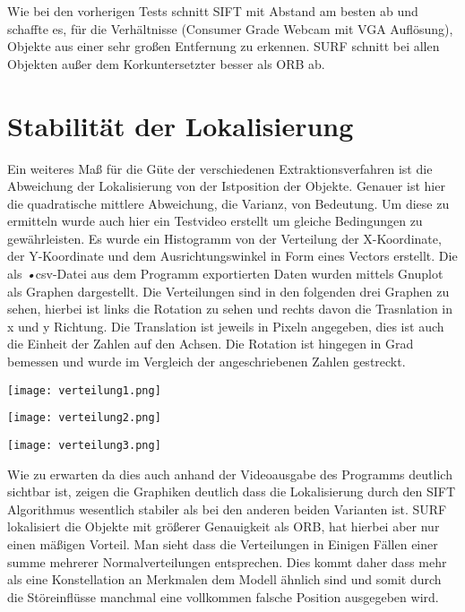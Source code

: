 Wie bei den vorherigen Tests schnitt SIFT mit Abstand am besten ab und schaffte es, für die Verhältnisse (Consumer Grade Webcam mit VGA Auflösung), Objekte aus einer sehr großen Entfernung zu erkennen.
SURF schnitt bei allen Objekten außer dem Korkuntersetzter besser als ORB ab.

\section{Stabilität der Lokalisierung}

Ein weiteres Maß für die Güte der verschiedenen Extraktionsverfahren ist die Abweichung der Lokalisierung von der Istposition der Objekte.
Genauer ist hier die quadratische mittlere Abweichung, die Varianz, von Bedeutung.
Um diese zu ermitteln wurde auch hier ein Testvideo erstellt um gleiche Bedingungen zu gewährleisten.
Es wurde ein Histogramm von der Verteilung der X-Koordinate, der Y-Koordinate und dem Ausrichtungswinkel in Form eines Vectors erstellt.
Die als \emph{•}{csv}-Datei aus dem Programm exportierten Daten wurden mittels Gnuplot als Graphen dargestellt.
Die Verteilungen sind in den folgenden drei Graphen zu sehen, hierbei ist links die Rotation zu sehen und rechts davon die Trasnlation in x und y Richtung.
Die Translation ist jeweils in Pixeln angegeben, dies ist auch die Einheit der Zahlen auf den Achsen.
Die Rotation ist hingegen in Grad bemessen und wurde im Vergleich der angeschriebenen Zahlen gestreckt.

\begin{center}
\texttt{[image: verteilung1.png]}

\texttt{[image: verteilung2.png]}

\texttt{[image: verteilung3.png]}
\end{center}


Wie zu erwarten da dies auch anhand der Videoausgabe des Programms deutlich sichtbar ist, zeigen die Graphiken deutlich dass die Lokalisierung durch den SIFT Algorithmus wesentlich stabiler als bei den anderen beiden Varianten ist.
SURF lokalisiert die Objekte mit größerer Genauigkeit als ORB, hat hierbei aber nur einen mäßigen Vorteil.
Man sieht dass die Verteilungen in Einigen Fällen einer summe mehrerer Normalverteilungen entsprechen. 
Dies kommt daher dass mehr als eine Konstellation an Merkmalen dem Modell ähnlich sind und somit durch die Störeinflüsse manchmal eine vollkommen falsche Position ausgegeben wird.

